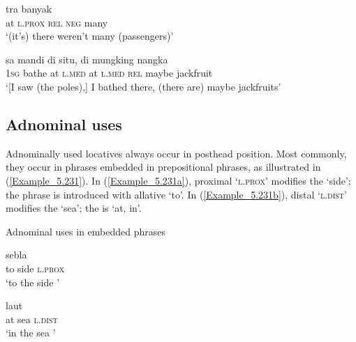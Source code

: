 \ea
\label{Example_5.229}
 {} {} {tra} {banyak}\\ %
 at  \textsc{l.prox}  \textsc{rel}  \textsc{neg}  many\\
 ‘(it’s)  there weren’t many (passengers)’ \textstyleExampleSource{[081025-008-Cv.0140]}
\z

\ea
\label{Example_5.230}
\gll {{\ldots}} {sa} {mandi} {di} {situ,} {di} {} {} {mungking} {nangka}\\ %
  { }  \textsc{1sg}  bathe  at  \textsc{l.med}  at  \textsc{l.med}  \textsc{rel}  maybe  jackfruit\\
\glt
‘[I saw (the poles),] I bathed there,  (there are) maybe jackfruits’ \textstyleExampleSource{[080922-010a-CvNF.0298]}
\z


\subsection{Adnominal uses}
\label{Para_5.7.2}
Adnominally used locatives always occur in posthead position. Most commonly, they occur in  phrases embedded in prepositional phrases, as illustrated in (\ref{Example_5.231}). In (\ref{Example_5.231a}), proximal  ‘\textsc{l.prox}’ modifies the    ‘side’; the  phrase is introduced with allative  ‘to’. In (\ref{Example_5.231b}), distal  ‘\textsc{l.dist}’ modifies the   ‘sea’; the  is   ‘at, in’.


\begin{styleExampleTitle}
Adnominal uses in embedded  phrases
\end{styleExampleTitle}
\ea
\label{Example_5.231}
\ea
\label{Example_5.231a}
 {sebla} {}\\
  to  side  \textsc{l.prox} \\
\glt ‘to the side {’ \textstyleExampleSource{[081011-001-Cv.0148]}}  \\
\vspace{5pt}

\ex
\label{Example_5.231b}
 {laut} {}\\ %
  at  sea  \textsc{l.dist}\\
 \glt ‘in the sea {’ \textstyleExampleSource{[080917-006-CvHt.0004]}}\\
\z
\z


